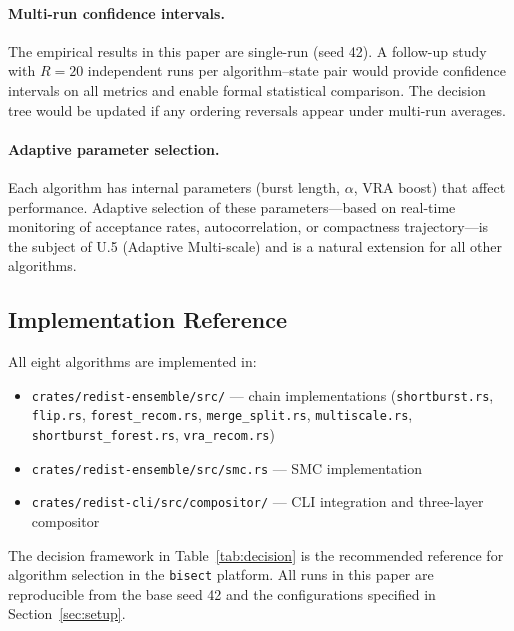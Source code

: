 \paragraph{Multi-run confidence intervals.}
The empirical results in this paper are single-run (seed 42).
A follow-up study with $R = 20$ independent runs per algorithm--state pair
would provide confidence intervals on all metrics and enable formal
statistical comparison.
The decision tree would be updated if any ordering reversals appear under
multi-run averages.

\paragraph{Adaptive parameter selection.}
Each algorithm has internal parameters (burst length, $\alpha$, VRA boost)
that affect performance.
Adaptive selection of these parameters---based on real-time monitoring of
acceptance rates, autocorrelation, or compactness trajectory---is the
subject of U.5 (Adaptive Multi-scale) and is a natural extension for
all other algorithms.

\subsection{Implementation Reference}

All eight algorithms are implemented in:
\begin{itemize}
  \item \texttt{crates/redist-ensemble/src/} --- chain implementations
        (\texttt{shortburst.rs}, \texttt{flip.rs}, \texttt{forest\_recom.rs},
        \texttt{merge\_split.rs}, \texttt{multiscale.rs},
        \texttt{shortburst\_forest.rs}, \texttt{vra\_recom.rs})
  \item \texttt{crates/redist-ensemble/src/smc.rs} --- SMC implementation
  \item \texttt{crates/redist-cli/src/compositor/} --- CLI integration and
        three-layer compositor
\end{itemize}

The decision framework in Table~\ref{tab:decision} is the recommended
reference for algorithm selection in the \texttt{bisect} platform.
All runs in this paper are reproducible from the base seed 42 and the
configurations specified in Section~\ref{sec:setup}.
